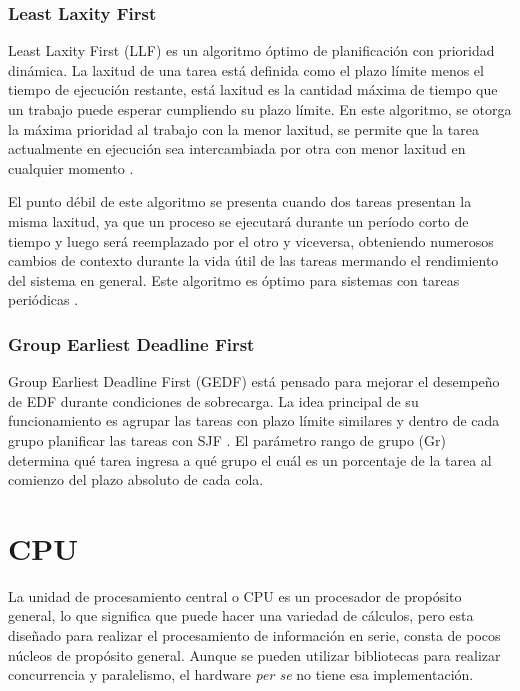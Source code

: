 \subsubsection{Least Laxity First}
Least Laxity First (LLF) es un algoritmo óptimo de planificación con prioridad dinámica. La laxitud de una tarea está definida como el plazo límite menos el tiempo de ejecución restante, está laxitud es la cantidad máxima de tiempo que un trabajo puede esperar cumpliendo su plazo límite. En este algoritmo, se otorga la máxima prioridad al trabajo con la menor laxitud, se permite que la tarea actualmente en ejecución sea intercambiada por otra con menor laxitud en cualquier momento \cite{NPr}.
  \vspace{0.3cm}
  
  El punto débil de este algoritmo se presenta cuando dos tareas presentan la misma laxitud, ya que un proceso se ejecutará durante un período corto de tiempo y luego será reemplazado por el otro y viceversa, obteniendo numerosos cambios de contexto durante la vida útil de las tareas mermando el rendimiento del sistema en general. Este algoritmo es óptimo para sistemas con tareas periódicas \cite{ComRTT}.

\subsubsection{Group Earliest Deadline First}
Group Earliest Deadline First (GEDF) está pensado para mejorar el desempeño de EDF durante condiciones de sobrecarga. La idea principal de su funcionamiento es agrupar las tareas con plazo límite similares y dentro de cada grupo planificar las tareas con SJF \cite{ComRTT}. El parámetro rango de grupo (Gr) determina qué tarea ingresa a qué grupo el cuál es un porcentaje de la tarea al comienzo del plazo absoluto de cada cola.


    \section{CPU}
    La unidad de procesamiento central o CPU es un procesador de propósito general, lo que significa que puede hacer una variedad de cálculos, pero esta diseñado para realizar el procesamiento de información en serie, consta de pocos núcleos de propósito general. Aunque se pueden utilizar bibliotecas para realizar concurrencia y paralelismo, el hardware \textit{per se} no tiene esa implementación.

